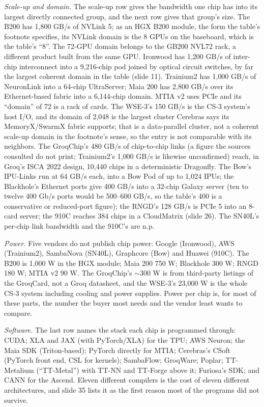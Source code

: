 \documentclass[11pt,letterpaper]{article}
\begin{document}
\emph{Scale-up and domain.} The scale-up row gives the bandwidth one chip has into its largest directly connected group, and the next row gives that group's size. The B200 has 1{,}800 GB/s of NVLink 5; as an HGX B200 module, the form the table's footnote specifies, its NVLink domain is the 8 GPUs on the baseboard, which is the table's ``8''. The 72-GPU domain belongs to the GB200 NVL72 rack, a different product built from the same GPU. Ironwood has 1{,}200 GB/s of inter-chip interconnect into a 9{,}216-chip pod joined by optical circuit switches, by far the largest coherent domain in the table (slide 11). Trainium2 has 1{,}000 GB/s of NeuronLink into a 64-chip UltraServer; Maia 200 has 2{,}800 GB/s over its Ethernet-based fabric into a 6{,}144-chip domain. MTIA v2 uses PCIe and its ``domain'' of 72 is a rack of cards. The WSE-3's 150 GB/s is the CS-3 system's host I/O, and its domain of 2{,}048 is the largest cluster Cerebras says its MemoryX/SwarmX fabric supports; that is a data-parallel cluster, not a coherent scale-up domain in the footnote's sense, so the entry is not comparable with its neighbors. The GroqChip's 480 GB/s of chip-to-chip links (a figure the sources consulted do not print; Trainium2's 1{,}000 GB/s is likewise unconfirmed) reach, in Groq's ISCA 2022 design, 10{,}440 chips in a deterministic Dragonfly. The Bow's IPU-Links run at 64 GB/s each, into a Bow Pod of up to 1{,}024 IPUs; the Blackhole's Ethernet ports give 400 GB/s into a 32-chip Galaxy server (ten to twelve 400 Gb/s ports would be 500--600 GB/s, so the table's 400 is a conservative or reduced-port figure); the RNGD's 128 GB/s is PCIe 5 into an 8-card server; the 910C reaches 384 chips in a CloudMatrix (slide 26). The SN40L's per-chip link bandwidth and the 910C's are n.p.

\emph{Power.} Five vendors do not publish chip power: Google (Ironwood), AWS (Trainium2), SambaNova (SN40L), Graphcore (Bow) and Huawei (910C). The B200 is 1{,}000 W in the HGX module; Maia 200 750 W; Blackhole 300 W; RNGD 180 W; MTIA v2 90 W. The GroqChip's ${\sim}$300 W is from third-party listings of the GroqCard, not a Groq datasheet, and the WSE-3's 23{,}000 W is the whole CS-3 system including cooling and power supplies. Power per chip is, for most of these parts, the number the buyer most needs and the vendor least wants to compare.

\emph{Software.} The last row names the stack each chip is programmed through: CUDA; XLA and JAX (with PyTorch/XLA) for the TPU; AWS Neuron; the Maia SDK (Triton-based); PyTorch directly for MTIA; Cerebras's CSoft (PyTorch front end, CSL for kernels); SambaFlow; GroqWare; Poplar; TT-Metalium (``TT-Metal'') with TT-NN and TT-Forge above it; Furiosa's SDK; and CANN for the Ascend. Eleven different compilers is the cost of eleven different architectures, and slide 35 lists it as the first reason most of the programs did not survive.
\end{document}
